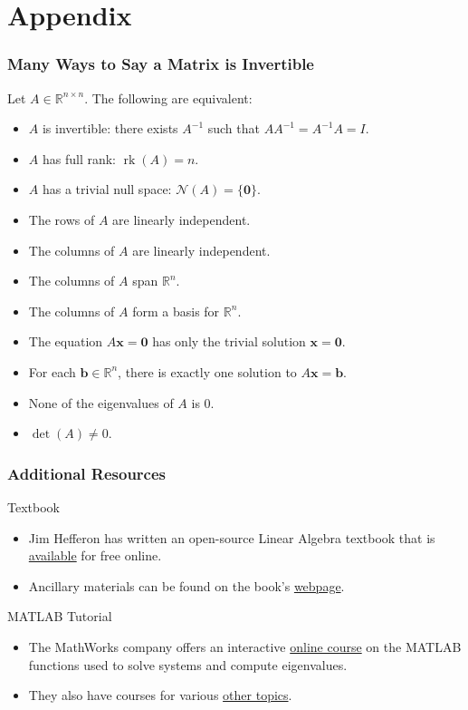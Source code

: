 \documentclass[xcolor=table]{beamer}
\newcommand{\R}{\mathbb{R}}
\newcommand{\nulls}{\mathcal{N}}
\newcommand{\vect}[1]{\boldsymbol{#1}}
\DeclareMathOperator{\rk}{rk}
\begin{document}
	\section{Appendix}
	\begin{frame}
		\frametitle{Many Ways to Say a Matrix is Invertible}
		\begin{theorem}
			Let $A\in\R^{n\times n}$. The following are equivalent:
			\begin{itemize}
				\item $A$ is invertible: there exists $A^{-1}$ such that $AA^{-1}=A^{-1}A=I$.
				\item $A$ has full rank: $\rk(A)=n$.
				\item $A$ has a trivial null space: $\nulls(A)=\{\vect{0}\}$.
				\item The rows of $A$ are linearly independent.
				\item The columns of $A$ are linearly independent.
				\item The columns of $A$ span $\R^n$.
				\item The columns of $A$ form a basis for $\R^n$.
				\item The equation $A\vect{x}=\vect{0}$ has only the trivial solution $\vect{x}=\vect{0}$.
				\item For each $\vect{b}\in\R^n$, there is exactly one solution to $A\vect{x}=\vect{b}$.
				\item None of the eigenvalues of $A$ is 0.
				\item $\det(A)\neq0$.
			\end{itemize}
		\end{theorem}
	\end{frame}
	
	\begin{frame}
		\frametitle{Additional Resources}
		\begin{block}{Textbook}
			\begin{itemize}
				\item Jim Hefferon has written an open-source Linear Algebra textbook that is \href{http://joshua.smcvt.edu/linearalgebra/book.pdf}{\alert{available}} for free online.
				\item Ancillary materials can be found on the book's \href{https://hefferon.net/linearalgebra/}{\alert{webpage}}.
			\end{itemize}
		\end{block}
		
		\begin{block}{MATLAB Tutorial}
			\begin{itemize}
				\item The MathWorks company offers an interactive \href{https://www.mathworks.com/learn/tutorials/introduction-to-linear-algebra-with-matlab.html}{\alert{online course}} on the MATLAB functions used to solve systems and compute eigenvalues.
				\item They also have courses for various \href{https://matlabacademy.mathworks.com/}{\alert{other topics}}.
			\end{itemize}
		\end{block}
	\end{frame}
	
\end{document}
